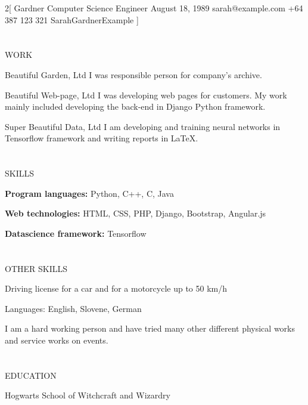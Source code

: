 \documentclass{my_cv}
\begin{document}
\begin{multicols}{2}[
        {Gardner}%
        {Computer Science Engineer}%
        {August 18, 1989}%
        {sarah@example.com}%
        {+64 387 123 321}%
        {SarahGardnerExample}
]

\section{\faPencil}{WORK}

%
    {Beautiful Garden, Ltd}%
    {I was responsible person for company’s archive.}

%
    {Beautiful Web-page, Ltd}%
    {I was developing web pages for customers. My work mainly included developing the back-end in Django Python framework.}
     
%
    {Super Beautiful Data, Ltd}%
    {I am developing and training neural networks in Tensorflow framework and writing reports in LaTeX.}
    
\section{\faFileText}{SKILLS}

\textbf{Program languages:} Python, C++, C, Java

\noindent\textbf{Web technologies:} HTML, CSS, PHP,
Django, Bootstrap, Angular.js

\noindent\textbf{Datascience framework:} Tensorflow

\section{\faFileText}{OTHER SKILLS}

Driving license for a car and for a motorcycle
up to 50 km/h

\noindent Languages: English, Slovene, German

\noindent I am a hard working person and have tried
many other different physical works and
service works on events.

\columnbreak

\section{\faGraduationCap}{EDUCATION}

%
    {Hogwarts School of Witchcraft and Wizardry}
    

\end{multicols}
\end{document}
